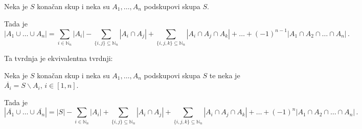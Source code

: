 \begin{theorem}
    Neka je $S$ konačan skup i neka su $A_1, \dots, A_n$ podskupovi skupa $S$.

    Tada je
    $$
        |A_1 \cup \dots \cup A_n| = \sum_{i\in\mathbb{N}_n} |A_i| - \sum_{\{i,j\}\subseteq\mathbb{N}_n} |A_i \cap A_j| + \sum_{\{i,j,k\}\subseteq\mathbb{N}_n}|A_i\cap A_j \cap A_k| + \dots + (-1)^{n-1} |A_1\cap A_2 \cap \dots \cap A_n|\,.
    $$
\end{theorem}

Ta tvrdnja je ekvivalentna tvrdnji:

\begin{theorem}
    Neka je $S$ konačan skup i neka su $A_1, \dots, A_n$ podskupovi skupa $S$ te neka je $\overline{A_i} = S \backslash A_i,\, i\in [1, n]$.

    Tada je
    $$
        |\overline{A_1} \cup \dots \cup \overline{A_n}| = |S| - \sum_{i\in\mathbb{N}_n} |A_i| + \sum_{\{i,j\}\subseteq\mathbb{N}_n} |A_i \cap A_j| + \sum_{\{i,j,k\}\subseteq\mathbb{N}_n}|A_i\cap A_j \cap A_k| + \dots + (-1)^{n} |A_1\cap A_2 \cap \dots \cap A_n|\,.
    $$
\end{theorem}
